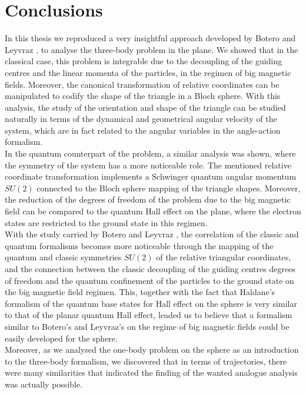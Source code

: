 \chapter{Conclusions}

In this thesis we reproduced a very insightful approach developed by Botero and Leyvraz \cite{alonso}, to analyse the three-body problem in the plane. We showed that in the classical case, this problem is integrable due to the decoupling of the guiding centres and the linear momenta of the particles, in the regimen of big magnetic fields. Moreover, the canonical transformation of relative coordinates can be manipulated to codify the shape of the triangle in a Bloch sphere. With this analysis, the study of the orientation and shape of the triangle can be studied naturally in terms of the dynamical and geometrical angular velocity of the system, which are in fact related to the angular variables in the angle-action formalism.\\

In the quantum counterpart of the problem, a similar analysis was shown, where the symmetry of the system has a more noticeable role. The mentioned relative coordinate transformation implements a Schwinger quantum angular momentum $SU(2)$ connected to the Bloch sphere mapping of the triangle shapes. Moreover, the reduction of the degrees of freedom of the problem due to the big magnetic field can be compared to the quantum Hall effect on the plane, where the electron states are restricted to the ground state in this regimen.\\

With the study carried by Botero and Leyvraz \cite{alonso}, the correlation of the classic and quantum formalisms becomes more noticeable through the mapping of the quantum and classic symmetries $SU(2)$ of the relative triangular coordinates, and the connection between the classic decoupling of the guiding centres degrees of freedom and the quantum confinement of the particles to the ground state on the big magnetic field regimen. This, together with the fact that Haldane's formalism \cite{haldane} of the quantum base states for Hall effect on the sphere is very similar to that of the planar quantum Hall effect, leaded us to believe that a formalism similar to Botero's and Leyvraz's on the regime of big magnetic fields could be easily developed for the sphere.\\

Moreover, as we analysed the one-body problem on the sphere as an introduction to the three-body formalism, we discovered that in terms of trajectories, there were many similarities that indicated the finding of the wanted analogue analysis was actually possible.\\

